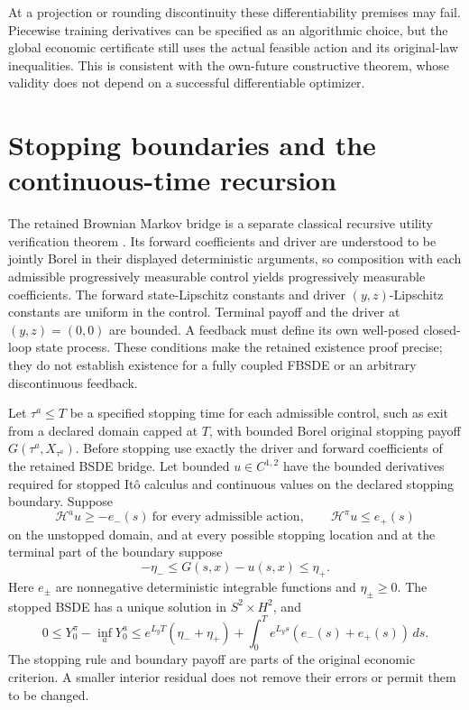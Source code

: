 At a projection or rounding discontinuity these differentiability
premises may fail.  Piecewise training derivatives can be specified
as an algorithmic choice, but the global economic certificate still
uses the actual feasible action and its original-law inequalities.
This is consistent with the own-future constructive theorem, whose
validity does not depend on a successful differentiable optimizer.

\section{Stopping boundaries and the continuous-time recursion}
\label{supp:bsdeboundaries119}
The retained Brownian Markov bridge is a separate classical recursive
utility verification theorem
\citep{PardouxPeng1990,ElKarouiPengQuenez1997}.  Its forward
coefficients and driver are understood to be jointly Borel in their
displayed deterministic arguments, so composition with each admissible
progressively measurable control yields progressively measurable
coefficients.  The forward state-Lipschitz constants and driver
$(y,z)$-Lipschitz constants are uniform in the control.  Terminal
payoff and the driver at $(y,z)=(0,0)$ are bounded.  A feedback
must define its own well-posed closed-loop state process.  These
conditions make the retained existence proof precise; they do not
establish existence for a fully coupled FBSDE or an arbitrary
discontinuous feedback.

\begin{proposition}
\label{prop:stoppedbsde119}
Let $\tau^a\le T$ be a specified stopping time for each admissible
control, such as exit from a declared domain capped at $T$, with
bounded Borel original stopping payoff $G(\tau^a,X_{\tau^a})$.
Before stopping use exactly the driver and forward coefficients of
the retained BSDE bridge.  Let bounded $u\in C^{1,2}$ have the bounded
derivatives required for stopped It\^o calculus and continuous
values on the declared stopping boundary.  Suppose
\[
 \mathcal H^a u\ge-e_-(s)\ \text{for every admissible action},
 \qquad\mathcal H^\pi u\le e_+(s)
\]
on the unstopped domain, and at every possible stopping location
and at the terminal part of the boundary suppose
\[
 -\eta_-\le G(s,x)-u(s,x)\le\eta_+.
\]
Here $e_\pm$ are nonnegative deterministic integrable functions
and $\eta_\pm\ge0$.  The stopped BSDE has a unique solution
in $S^2\times H^2$, and
\[
 0\le Y_0^\pi-\inf_aY_0^a
 \le e^{L_yT}(\eta_-+\eta_+)
       +\int_0^T e^{L_ys}(e_-(s)+e_+(s))\,ds.
\]
The stopping rule and boundary payoff are parts of the original
economic criterion.  A smaller interior residual does not remove
their errors or permit them to be changed.
\end{proposition}

